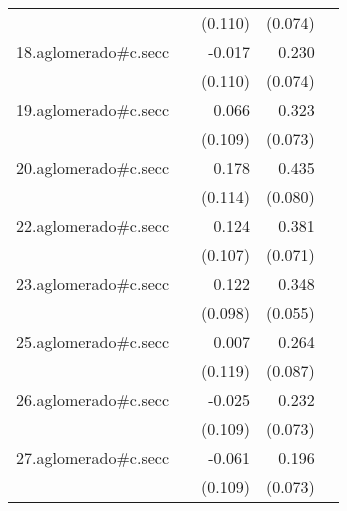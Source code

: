 {\begin{longtable}{l*{4}{D{.}{.}{-1}}}
            &                     &     (0.110)         &     (0.074)         &                     \\
\addlinespace
18.aglomerado#c.secc&                     &      -0.017         &       0.230\sym{**} &                     \\
            &                     &     (0.110)         &     (0.074)         &                     \\
\addlinespace
19.aglomerado#c.secc&                     &       0.066         &       0.323\sym{***}&                     \\
            &                     &     (0.109)         &     (0.073)         &                     \\
\addlinespace
20.aglomerado#c.secc&                     &       0.178         &       0.435\sym{***}&                     \\
            &                     &     (0.114)         &     (0.080)         &                     \\
\addlinespace
22.aglomerado#c.secc&                     &       0.124         &       0.381\sym{***}&                     \\
            &                     &     (0.107)         &     (0.071)         &                     \\
\addlinespace
23.aglomerado#c.secc&                     &       0.122         &       0.348\sym{***}&                     \\
            &                     &     (0.098)         &     (0.055)         &                     \\
\addlinespace
25.aglomerado#c.secc&                     &       0.007         &       0.264\sym{**} &                     \\
            &                     &     (0.119)         &     (0.087)         &                     \\
\addlinespace
26.aglomerado#c.secc&                     &      -0.025         &       0.232\sym{**} &                     \\
            &                     &     (0.109)         &     (0.073)         &                     \\
\addlinespace
27.aglomerado#c.secc&                     &      -0.061         &       0.196\sym{**} &                     \\
            &                     &     (0.109)         &     (0.073)         &                     \\

\end{longtable}}
